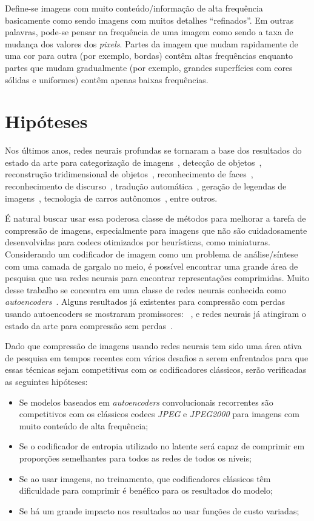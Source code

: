 Define-se imagens com muito conteúdo/informação de alta frequência basicamente como sendo imagens com muitos detalhes ``refinados''. Em outras palavras, pode-se pensar na frequência de uma imagem como sendo a taxa de mudança dos valores dos \textit{pixels}. Partes da imagem que mudam rapidamente de uma cor para outra (por exemplo, bordas) contêm altas frequências enquanto partes que mudam gradualmente (por exemplo, grandes superfícies com cores sólidas e uniformes) contêm apenas baixas frequências.
\section{Hipóteses}
\label{sec:hipotese}
Nos últimos anos, redes neurais profundas se tornaram a base dos resultados do estado da arte para categorização de imagens~\cite{simonyan}, detecção de objetos~\cite{girshick2014rich}, reconstrução tridimensional de objetos~\cite{choy20163d}, reconhecimento de faces~\cite{deepface}, reconhecimento de discurso~\cite{graves}, tradução automática~\cite{sequence}, geração de legendas de imagens~\cite{vinyals2015show}, tecnologia de carros autônomos~\cite{huval2015empirical}, entre outros. 

É natural buscar usar essa poderosa classe de métodos para melhorar a tarefa de compressão de imagens, especialmente para imagens que não são cuidadosamente desenvolvidas para codecs otimizados por heurísticas, como miniaturas. Considerando um codificador de imagem como um problema de análise/síntese com uma camada de gargalo no meio, é possível encontrar uma grande área de pesquisa que usa redes neurais para encontrar representações comprimidas. Muito desse trabalho se concentra em uma classe de redes neurais conhecida como \emph{autoencoders}~\cite{autoencoder2011}. Alguns resultados já existentes para compressão com perdas usando autoencoders se mostraram promissores: ~\cite{gregor2016, toderici2017, toderici2016}, e redes neurais já atingiram o estado da arte para compressão sem perdas~\cite{mentzer2019, theis2015generative}. 

Dado que compressão de imagens usando redes neurais tem sido uma área ativa de pesquisa em tempos recentes com vários desafios a serem enfrentados para que essas técnicas sejam competitivas com os codificadores clássicos, serão verificadas as seguintes hipóteses:
\begin{itemize}
    \item Se modelos baseados em \textit{autoencoders} convolucionais recorrentes são competitivos com os clássicos codecs \textit{JPEG} e \textit{JPEG2000} para imagens com muito conteúdo de alta frequência;
    \item Se o codificador de entropia utilizado no latente será capaz de comprimir em proporções semelhantes para todos as redes de todos os níveis;
    \item Se ao usar imagens, no treinamento, que codificadores clássicos têm dificuldade para comprimir é benéfico para os resultados do modelo;
    \item Se há um grande impacto nos resultados ao usar funções de custo variadas;
\end{itemize}

